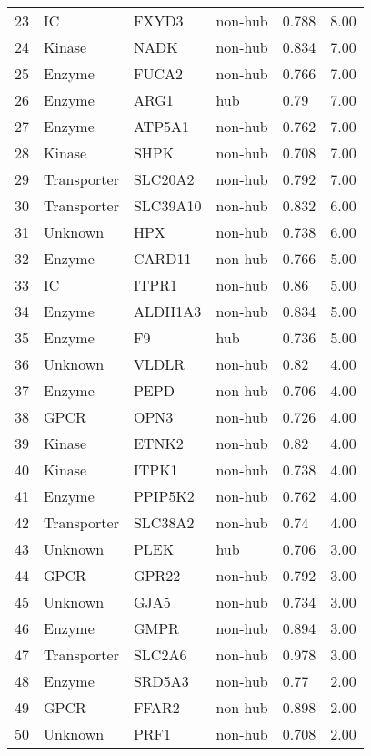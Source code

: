 \documentclass[a4paper,8pt,twocolumn,5p]{elsarticle}
\begin{document}
\begin{table*}[h]
\begin{tabular}{rllllr}
  23 & IC & FXYD3 & non-hub & 0.788 & 8.00 \\ 
  24 & Kinase & NADK & non-hub & 0.834 & 7.00 \\ 
  25 & Enzyme & FUCA2 & non-hub & 0.766 & 7.00 \\ 
  26 & Enzyme & ARG1 & hub & 0.79 & 7.00 \\ 
  27 & Enzyme & ATP5A1 & non-hub & 0.762 & 7.00 \\ 
  28 & Kinase & SHPK & non-hub & 0.708 & 7.00 \\ 
  29 & Transporter & SLC20A2 & non-hub & 0.792 & 7.00 \\ 
  30 & Transporter & SLC39A10 & non-hub & 0.832 & 6.00 \\ 
  31 & Unknown & HPX & non-hub & 0.738 & 6.00 \\ 
  32 & Enzyme & CARD11 & non-hub & 0.766 & 5.00 \\ 
  33 & IC & ITPR1 & non-hub & 0.86 & 5.00 \\ 
  34 & Enzyme & ALDH1A3 & non-hub & 0.834 & 5.00 \\ 
  35 & Enzyme & F9 & hub & 0.736 & 5.00 \\ 
  36 & Unknown & VLDLR & non-hub & 0.82 & 4.00 \\ 
  37 & Enzyme & PEPD & non-hub & 0.706 & 4.00 \\ 
  38 & GPCR & OPN3 & non-hub & 0.726 & 4.00 \\ 
  39 & Kinase & ETNK2 & non-hub & 0.82 & 4.00 \\ 
  40 & Kinase & ITPK1 & non-hub & 0.738 & 4.00 \\ 
  41 & Enzyme & PPIP5K2 & non-hub & 0.762 & 4.00 \\ 
  42 & Transporter & SLC38A2 & non-hub & 0.74 & 4.00 \\ 
  43 & Unknown & PLEK & hub & 0.706 & 3.00 \\ 
  44 & GPCR & GPR22 & non-hub & 0.792 & 3.00 \\ 
  45 & Unknown & GJA5 & non-hub & 0.734 & 3.00 \\ 
  46 & Enzyme & GMPR & non-hub & 0.894 & 3.00 \\ 
  47 & Transporter & SLC2A6 & non-hub & 0.978 & 3.00 \\ 
  48 & Enzyme & SRD5A3 & non-hub & 0.77 & 2.00 \\ 
  49 & GPCR & FFAR2 & non-hub & 0.898 & 2.00 \\ 
  50 & Unknown & PRF1 & non-hub & 0.708 & 2.00 \\ 
    \hline
\end{tabular}
\end{table*}
\normalsize
\end{document}
